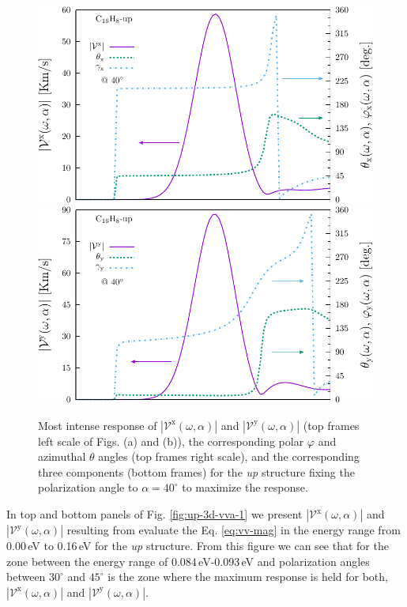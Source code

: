 \documentclass[prb,11pt,tightenlines,twocolumn,aps]{revtex4-1}
\begin{document}
\begin{figure}[t]
    \centering
    \includegraphics[width=\linewidth]{upplots/up-vxb-rtp-m1}
    \\
    \includegraphics[width=\linewidth]{upplots/up-vyb-rtp-m1}
    
    \caption{Most intense response of
    $|\mathcal{V}^{\mathrm{x}}(\omega,\alpha)|$ and
    $|\mathcal{V}^{\mathrm{y}}(\omega,\alpha)|$ (top frames left scale of Figs.
    (a) and (b)), the corresponding polar $\varphi$ and azimuthal $\theta$
    angles (top frames right scale), and the corresponding three components
    (bottom frames) for the \emph{up} structure fixing the polarization angle to
    $\alpha=40^{\circ}$ to maximize the response.}
    \label{fig:up-vab-comp-rtp-1}
\end{figure}

In top and bottom panels of Fig. \ref{fig:up-3d-vva-1} we present
$|\mathcal{V}^{\mathrm{x}}(\omega,\alpha)|$ and
$|\mathcal{V}^{\mathrm{y}}(\omega,\alpha)|$ resulting from evaluate the Eq.
\eqref{eq:vv-mag} in the energy range from 0.00\,eV to 0.16\,eV for the
\emph{up} structure.
%
From this figure we can see that for the zone between the energy range of
0.084\,eV-0.093\,eV and polarization angles between $30^{\circ}$ and
$45^{\circ}$ is the zone where the maximum response is held for both,
$|\mathcal{V}^{\mathrm{x}}(\omega,\alpha)|$ and
$|\mathcal{V}^{\mathrm{y}}(\omega,\alpha)|$.
\end{document}
